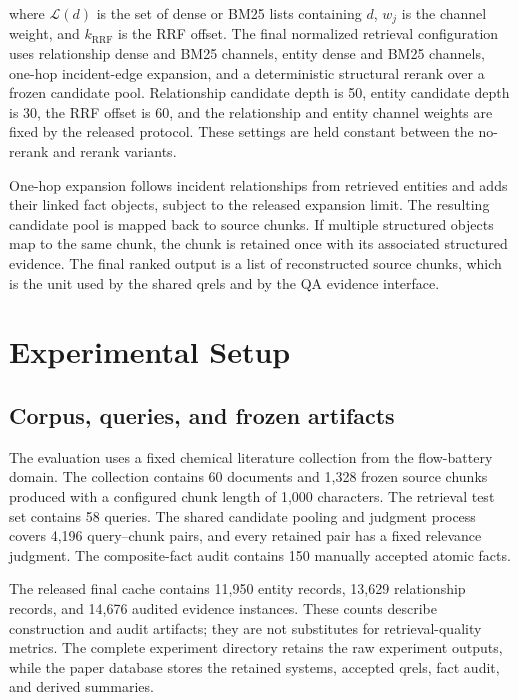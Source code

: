where $\mathcal{L}(d)$ is the set of dense or BM25 lists containing $d$, $w_j$ is the channel weight, and $k_{\mathrm{RRF}}$ is the RRF offset. The final normalized retrieval configuration uses relationship dense and BM25 channels, entity dense and BM25 channels, one-hop incident-edge expansion, and a deterministic structural rerank over a frozen candidate pool. Relationship candidate depth is 50, entity candidate depth is 30, the RRF offset is 60, and the relationship and entity channel weights are fixed by the released protocol. These settings are held constant between the no-rerank and rerank variants.

One-hop expansion follows incident relationships from retrieved entities and adds their linked fact objects, subject to the released expansion limit. The resulting candidate pool is mapped back to source chunks. If multiple structured objects map to the same chunk, the chunk is retained once with its associated structured evidence. The final ranked output is a list of reconstructed source chunks, which is the unit used by the shared qrels and by the QA evidence interface.

\section{Experimental Setup}

\subsection{Corpus, queries, and frozen artifacts}

The evaluation uses a fixed chemical literature collection from the flow-battery domain. The collection contains 60 documents and 1,328 frozen source chunks produced with a configured chunk length of 1,000 characters. The retrieval test set contains 58 queries. The shared candidate pooling and judgment process covers 4,196 query--chunk pairs, and every retained pair has a fixed relevance judgment. The composite-fact audit contains 150 manually accepted atomic facts.

The released final cache contains 11,950 entity records, 13,629 relationship records, and 14,676 audited evidence instances. These counts describe construction and audit artifacts; they are not substitutes for retrieval-quality metrics. The complete experiment directory retains the raw experiment outputs, while the paper database stores the retained systems, accepted qrels, fact audit, and derived summaries.

